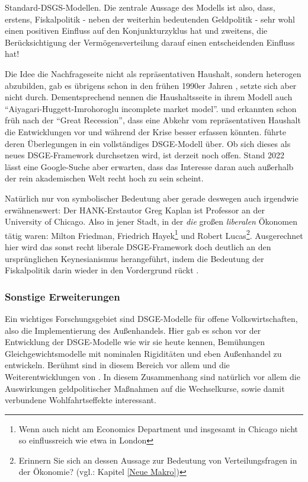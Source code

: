 Standard-DSGS-Modellen. Die zentrale Aussage des Modells ist also, dass, erstens, Fiskalpolitik - neben der weiterhin bedeutenden Geldpolitik - sehr wohl einen positiven Einfluss auf den Konjunkturzyklus hat und zweitens, die Berücksichtigung der Vermögensverteilung darauf einen entscheidenden Einfluss hat!

Die Idee die Nachfrageseite nicht als repräsentativen Haushalt, sondern heterogen abzubilden, gab es übrigens schon in den frühen 1990er Jahren \parencite{Imrohoroglu1989, Huggett1993, Aiyagari1994}, setzte sich aber nicht durch. Dementsprechend nennen \textcite[S. 699]{Kaplan2018} die Haushaltsseite in ihrem Modell auch "`Aiyagari-Huggett-Imrohoroglu incomplete market model"'. \textcite{Oh2012} und \textcite{McKay2016} erkannten schon früh nach der "`Great Recession"', dass eine Abkehr vom repräsentativen Haushalt die Entwicklungen vor und während der Krise besser erfassen könnten. \textcite{Kaplan2018} führte deren Überlegungen in ein vollständiges DSGE-Modell über. Ob sich dieses als neues DSGE-Framework durchsetzen wird, ist derzeit noch offen. Stand 2022 lässt eine Google-Suche aber erwarten, dass das Interesse daran auch außerhalb der rein akademischen Welt recht hoch zu sein scheint.

Natürlich nur von symbolischer Bedeutung aber gerade deswegen auch irgendwie erwähnenswert: Der HANK-Erstautor Greg Kaplan ist Professor an der University of Chicago. Also in  jener Stadt, in der \textit{die} großen \textit{liberalen} Ökonomen tätig waren: Milton Friedman, Friedrich Hayek\footnote{Wenn auch nicht am Economics Department und insgesamt in Chicago nicht so einflussreich wie etwa in London} und Robert Lucas\footnote{Erinnern Sie sich an dessen Aussage zur Bedeutung von Verteilungsfragen in der Ökonomie? (vgl.: Kapitel \ref{Neue Makro})}. Ausgerechnet hier wird das sonst recht liberale DSGE-Framework doch deutlich an den ursprünglichen Keynesianismus herangeführt, indem die Bedeutung der Fiskalpolitik darin wieder in den Vordergrund rückt \parencite[S. 173]{Kaplan2018b}.

\subsubsection{Sonstige Erweiterungen}
Ein wichtiges Forschungsgebiet sind DSGE-Modelle für offene Volkswirtschaften, also die Implementierung des Außenhandels. Hier gab es schon vor der Entwicklung der DSGE-Modelle wie wir sie heute kennen, Bemühungen Gleichgewichtsmodelle mit nominalen Rigiditäten und eben Außenhandel zu entwickeln. Berühmt sind in diesem Bereich vor allem \textcite{Obstfeld1995, Obstfeld2002} und die Weiterentwicklungen von \textcite{Corsetti2001}. In diesem Zusammenhang sind natürlich vor allem die Auswirkungen geldpolitischer Maßnahmen auf die Wechselkurse, sowie damit verbundene Wohlfahrtseffekte interessant.

